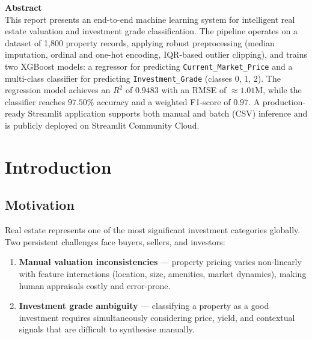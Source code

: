 \documentclass[12pt,a4paper]{article}
\begin{document}
\begin{mdframed}[backgroundcolor=lightgray, linecolor=primaryblue, linewidth=1pt, innertopmargin=10pt, innerbottommargin=10pt]
\textbf{\large Abstract}\\[6pt]
This report presents an end-to-end machine learning system for intelligent real estate
valuation and investment grade classification. The pipeline operates on a dataset of
1,800 property records, applying robust preprocessing (median imputation, ordinal and
one-hot encoding, IQR-based outlier clipping), and trains two XGBoost models: a
regressor for predicting \texttt{Current\_Market\_Price} and a multi-class classifier for
predicting \texttt{Investment\_Grade} (classes 0, 1, 2). The regression model achieves an
$R^2$ of $\mathbf{0.9483}$ with an RMSE of $\approx\!1.01\text{M}$, while the classifier
reaches $\mathbf{97.50\%}$ accuracy and a weighted F1-score of $\mathbf{0.97}$. A
production-ready Streamlit application supports both manual and batch (CSV) inference
and is publicly deployed on Streamlit Community Cloud.
\end{mdframed}

\tableofcontents
\newpage

\section{Introduction}

\subsection{Motivation}

Real estate represents one of the most significant investment categories globally. Two
persistent challenges face buyers, sellers, and investors:

\begin{enumerate}
    \item \textbf{Manual valuation inconsistencies} --- property pricing varies non-linearly with
          feature interactions (location, size, amenities, market dynamics), making human
          appraisals costly and error-prone.
    \item \textbf{Investment grade ambiguity} --- classifying a property as a good investment
          requires simultaneously considering price, yield, and contextual signals that are
          difficult to synthesise manually.
\end{enumerate}
\end{document}
